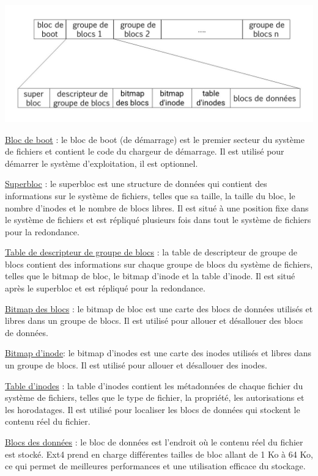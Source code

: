 \documentclass[12pt, letterpaper]{report}
\begin{document}
\centering \includegraphics[width=\textwidth]{structure}
\justifying

\underline{Bloc de boot} : le bloc de boot (de démarrage) est le premier secteur du système de fichiers et contient le code du chargeur de démarrage. Il est utilisé pour démarrer le système d'exploitation, il est optionnel. 

\underline{Superbloc} : le superbloc est une structure de données qui contient des informations sur le système de fichiers, telles que sa taille, la taille du bloc, le nombre d'inodes et le nombre de blocs libres. Il est situé à une position fixe dans le système de fichiers et est répliqué plusieurs fois dans tout le système de fichiers pour la redondance.

\underline{Table de descripteur de groupe de blocs} : la table de descripteur de groupe de blocs contient des informations sur chaque groupe de blocs du système de fichiers, telles que le bitmap de bloc, le bitmap d'inode et la table d'inode. Il est situé après le superbloc et est répliqué pour la redondance.

\underline {Bitmap des blocs} : le bitmap de bloc est une carte des blocs de données utilisés et libres dans un groupe de blocs. Il est utilisé pour allouer et désallouer des blocs de données.

\underline{Bitmap d'inode}: le bitmap d'inodes est une carte des inodes utilisés et libres dans un groupe de blocs. Il est utilisé pour allouer et désallouer des inodes.

\underline{Table d'inodes} : la table d'inodes contient les métadonnées de chaque fichier du système de fichiers, telles que le type de fichier, la propriété, les autorisations et les horodatages. Il est utilisé pour localiser les blocs de données qui stockent le contenu réel du fichier.

\underline{Blocs des données} : le bloc de données est l'endroit où le contenu réel du fichier est stocké. Ext4 prend en charge différentes tailles de bloc allant de 1 Ko à 64 Ko, ce qui permet de meilleures performances et une utilisation efficace du stockage.
\end{document}
